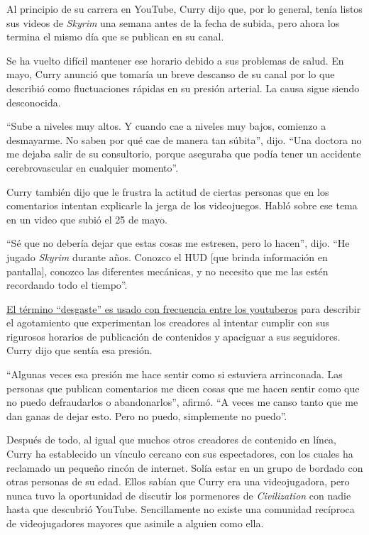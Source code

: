 Al principio de su carrera en YouTube, Curry dijo que, por lo general,
tenía listos sus videos de \emph{Skyrim} una semana antes de la fecha de
subida, pero ahora los termina el mismo día que se publican en su canal.

Se ha vuelto difícil mantener ese horario debido a sus problemas de
salud. En mayo, Curry anunció que tomaría un breve descanso de su canal
por lo que describió como fluctuaciones rápidas en su presión arterial.
La causa sigue siendo desconocida.

``Sube a niveles muy altos. Y cuando cae a niveles muy bajos, comienzo a
desmayarme. No saben por qué cae de manera tan súbita'', dijo. ``Una
doctora no me dejaba salir de su consultorio, porque aseguraba que podía
tener un accidente cerebrovascular en cualquier momento''.

Curry también dijo que le frustra la actitud de ciertas personas que en
los comentarios intentan explicarle la jerga de los videojuegos. Habló
sobre ese tema en un video que subió el 25 de mayo.

``Sé que no debería dejar que estas cosas me estresen, pero lo hacen'',
dijo. ``He jugado \emph{Skyrim} durante años. Conozco el HUD {[}que
brinda información en pantalla{]}, conozco las diferentes mecánicas, y
no necesito que me las estén recordando todo el tiempo''.

\href{https://www.insider.com/youtube-burnout-alishamarie-pewdiepie-casey-neistat-describe-pressures-of-the-industry-2019-1}{El
término ``desgaste'' es usado con frecuencia entre los youtuberos} para
describir el agotamiento que experimentan los creadores al intentar
cumplir con sus rigurosos horarios de publicación de contenidos y
apaciguar a sus seguidores. Curry dijo que sentía esa presión.

``Algunas veces esa presión me hace sentir como si estuviera
arrinconada. Las personas que publican comentarios me dicen cosas que me
hacen sentir como que no puedo defraudarlos o abandonarlos'', afirmó.
``A veces me canso tanto que me dan ganas de dejar esto. Pero no puedo,
simplemente no puedo''.

Después de todo, al igual que muchos otros creadores de contenido en
línea, Curry ha establecido un vínculo cercano con sus espectadores, con
los cuales ha reclamado un pequeño rincón de internet. Solía estar en un
grupo de bordado con otras personas de su edad. Ellos sabían que Curry
era una videojugadora, pero nunca tuvo la oportunidad de discutir los
pormenores de \emph{Civilization} con nadie hasta que descubrió YouTube.
Sencillamente no existe una comunidad recíproca de videojugadores
mayores que asimile a alguien como ella.

